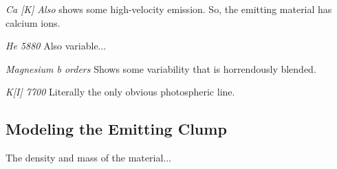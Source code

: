 \documentclass{nature3}
\begin{document}
\begin{methods}
{\it Ca [K]}
{\it Also} shows some high-velocity emission.  So, the emitting material has
calcium ions.

{\it He 5880}
Also variable...

{\it Magnesium b orders}
Shows some variability that is horrendously blended.

{\it K[I] 7700}
Literally the only obvious photospheric line.



\subsection{Modeling the Emitting Clump}
\label{subsec:model}

The density and mass of the material...





\end{methods}
\end{document}
